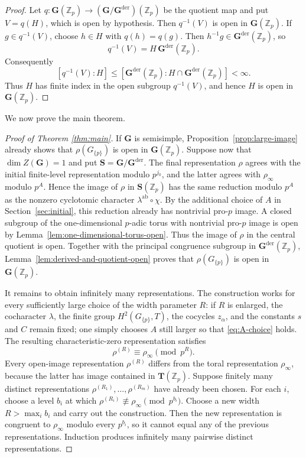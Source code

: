 \documentclass[11pt]{amsart}
\numberwithin{equation}{section}
\newcommand{\Zp}{\mathbb Z_p}
\newcommand{\GG}{\mathbf G}
\newcommand{\TT}{\mathbf T}
\newcommand{\Gder}{\mathbf G^{\mathrm{der}}}
\theoremstyle{definition}
\begin{document}
\begin{proof}
Let $q:\GG(\Zp)\to(\GG/\Gder)(\Zp)$ be the quotient map and put
$V=q(H)$, which is open by hypothesis.  Then $q^{-1}(V)$ is open in
$\GG(\Zp)$.  If $g\in q^{-1}(V)$, choose $h\in H$ with
$q(h)=q(g)$.  Then $h^{-1}g\in\Gder(\Zp)$, so
\[
        q^{-1}(V)=H\,\Gder(\Zp).
\]
Consequently
\[
 [q^{-1}(V):H]
 \le [\Gder(\Zp):H\cap\Gder(\Zp)]<\infty.
\]
Thus $H$ has finite index in the open subgroup $q^{-1}(V)$, and hence
$H$ is open in $\GG(\Zp)$.
\end{proof}
We now prove the main theorem.
\begin{proof}[Proof of Theorem \ref{thm:main}]If $\GG$ is semisimple, Proposition~\ref{prop:large-image} already
shows that $\rho(G_{\{p\}})$ is open in $\GG(\Zp)$.  Suppose now that
$\dim Z(\GG)=1$ and put $\mathbf S=\GG/\Gder$.  The final
representation $\rho$ agrees with the initial finite-level
representation modulo $p^{j_0}$, and the latter agrees with
$\rho_\infty$ modulo $p^A$.  Hence the image of $\rho$ in
$\mathbf S(\Zp)$ has the same reduction modulo $p^A$ as the nonzero
cyclotomic character
$\lambda^{\mathrm{ab}}\circ\chi$.  By the additional choice of $A$ in
Section~\ref{sec:initial}, this reduction already has nontrivial
pro-$p$ image. A closed subgroup of the one-dimensional $p$-adic torus
with nontrivial pro-$p$ image is open by
Lemma~\ref{lem:one-dimensional-torus-open}.  Thus the image of
$\rho$ in the central quotient is open.  Together with the principal
congruence subgroup in $\Gder(\Zp)$, Lemma~\ref{lem:derived-and-quotient-open}
proves that $\rho(G_{\{p\}})$ is open in $\GG(\Zp)$.

It remains to obtain infinitely many representations.  The construction
works for every sufficiently large choice of the width parameter $R$:
if $R$ is enlarged, the cocharacter $\lambda$, the finite group
$H^2(G_{\{p\}},T)$, the cocycles $z_\alpha$, and the constants $s$ and
$C$ remain fixed; one simply chooses $A$ still larger so that
\eqref{eq:A-choice} holds.  The resulting characteristic-zero
representation satisfies
\[
        \rho^{(R)}\equiv\rho_\infty\pmod{p^R}.
\]
Every open-image representation $\rho^{(R)}$ differs from the toral
representation $\rho_\infty$, because the latter has image contained in
$\TT(\Zp)$.  Suppose finitely many distinct representations
$\rho^{(R_1)},\ldots,\rho^{(R_m)}$ have already been chosen.  For each
$i$, choose a level $b_i$ at which
$\rho^{(R_i)}\not\equiv\rho_\infty\pmod{p^{b_i}}$.  Choose a new width
$R>\max_i b_i$ and carry out the construction.  Then the new
representation is congruent to $\rho_\infty$ modulo every $p^{b_i}$,
so it cannot equal any of the previous representations.  Induction
produces infinitely many pairwise distinct representations.


\end{proof}
\end{document}
